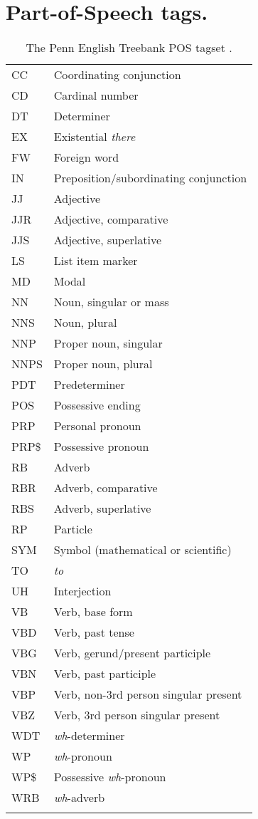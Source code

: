 
\section{Part-of-Speech tags.}
%
\begin{table}[htbp]
	\small
	\caption{The Penn English Treebank POS tagset \parencite{Marcus.1993}.}
	\label{tab:POS_tags}
	\centering
	\begin{tabular}{ll}
		\toprule
		CC& Coordinating conjunction \\
		CD& Cardinal number\\
		DT& Determiner\\
		EX& Existential \textit{there}\\
		FW& Foreign word\\
		IN& Preposition/subordinating conjunction\\
		JJ& Adjective\\
		JJR& Adjective, comparative\\
		JJS& Adjective, superlative\\
		LS& List item marker\\
		MD& Modal\\
		NN& Noun, singular or mass\\
		NNS& Noun, plural\\
		NNP& Proper noun, singular\\
		NNPS& Proper noun, plural\\
		PDT& Predeterminer\\
		POS& Possessive ending\\
		PRP& Personal pronoun\\
		PRP\$& Possessive pronoun\\
		RB& Adverb\\
		RBR& Adverb, comparative\\
		RBS& Adverb, superlative\\
		RP& Particle\\
		SYM& Symbol (mathematical or scientific)\\
		TO& \textit{to}\\
		UH& Interjection\\
		VB& Verb, base form\\
		VBD& Verb, past tense\\
		VBG& Verb, gerund/present participle\\
		VBN& Verb, past participle\\
		VBP& Verb, non-3rd person singular present \\
		VBZ& Verb, 3rd person singular present\\
		WDT& \textit{wh}-determiner\\
		WP& \textit{wh}-pronoun\\
		WP\$& Possessive \textit{wh}-pronoun\\
		WRB& \textit{wh}-adverb\\
		& \\
		\bottomrule
	\end{tabular}
\end{table}
